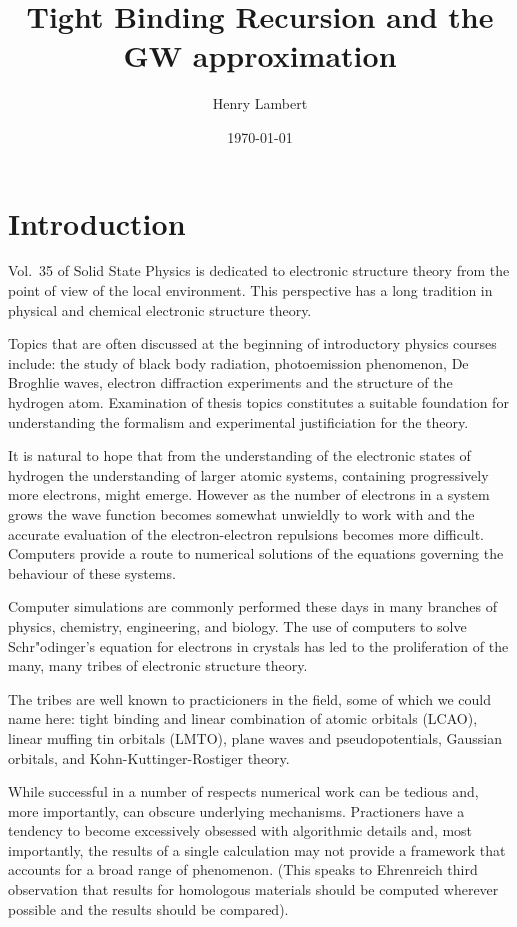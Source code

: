 \documentclass{article}
\begin{document}
\title{Tight Binding Recursion and the GW approximation}
\author{Henry Lambert}
\date{\today}
\maketitle

\section{Introduction}
  Vol.~35 of Solid State Physics is dedicated to electronic structure
theory from the point of view of the local environment. This perspective
has a long tradition in physical and chemical electronic structure theory.

  Topics that are often discussed at the beginning of introductory physics courses include:
the study of black body radiation, photoemission phenomenon, De Broghlie waves,
electron diffraction experiments and the structure of the hydrogen atom.
Examination of thesis topics constitutes a suitable foundation 
for understanding the formalism and experimental justificiation for the theory.

  It is natural to hope that from the understanding of the electronic states of hydrogen the
understanding of larger atomic systems, containing progressively more electrons, might emerge. 
However as the number of electrons in a system grows the wave function becomes 
somewhat unwieldly to work with and the accurate evaluation of the 
electron-electron repulsions becomes more difficult. Computers provide a route
to numerical solutions of the equations governing the behaviour of these systems.

Computer simulations are commonly performed 
these days in many branches of physics, chemistry, engineering, and biology.
The use of computers to solve Schr"odinger's equation for electrons in crystals
has led to the proliferation of the many, many tribes of electronic structure 
theory. 

The tribes are well known to practicioners in the field, some of which we could name 
here: tight binding and linear combination of atomic orbitals (LCAO), 
linear muffing tin orbitals (LMTO), plane waves and pseudopotentials, 
Gaussian orbitals, and Kohn-Kuttinger-Rostiger theory.

While successful in a number of respects numerical work can be tedious and, more importantly, can obscure underlying
mechanisms. Practioners have a tendency to become excessively obsessed with algorithmic details and, most importantly,
the results of a single calculation may not provide a framework that accounts for a broad range
of phenomenon. (This speaks to Ehrenreich third observation that results for homologous materials should be computed
wherever possible and the results should be compared). 
\end{document}
